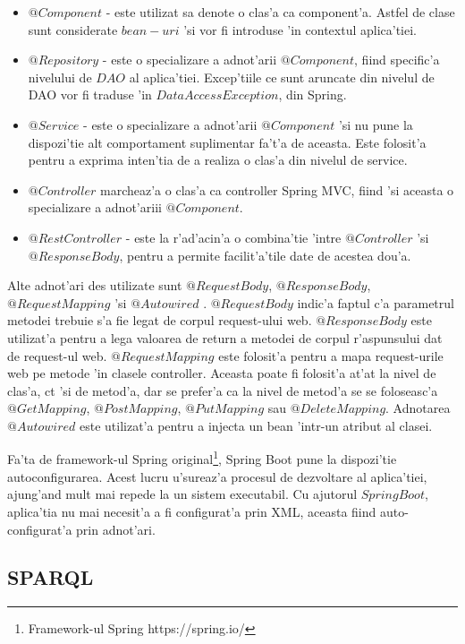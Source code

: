\documentclass[12pt,a4paper,twoside]{report}
\begin{document}
\begin{itemize}
    \item $@Component$ - este utilizat sa denote o clas'a ca component'a. Astfel de clase sunt considerate $bean-uri$ 'si vor fi introduse 'in contextul aplica'tiei.
    \item $@Repository$ - este o specializare a adnot'arii $@Component$, fiind specific'a nivelului de $DAO$ al aplica'tiei. Excep'tiile ce sunt aruncate din nivelul de DAO vor fi traduse 'in $DataAccessException$, din Spring.
    \item $@Service$ - este o specializare a adnot'arii $@Component$ 'si nu pune la dispozi'tie alt comportament suplimentar fa't'a de aceasta. Este folosit'a pentru a exprima inten'tia de a realiza o clas'a din nivelul de service.
    \item $@Controller$ marcheaz'a o clas'a ca controller Spring MVC, fiind 'si aceasta o specializare a adnot'ariii $@Component$.
    \item $@RestController$ - este la r'ad'acin'a o combina'tie 'intre $@Controller$ 'si $@ResponseBody$,  pentru a permite facilit'a'tile date de acestea dou'a.
\end{itemize}

Alte adnot'ari des utilizate sunt $@RequestBody$, $@ResponseBody$, $@RequestMapping$ 'si $@Autowired$ . $@RequestBody$ indic'a faptul c'a parametrul metodei trebuie s'a fie legat de corpul request-ului web. $@ResponseBody$ este utilizat'a pentru a lega valoarea de return a metodei de corpul r'aspunsului dat de request-ul web. $@RequestMapping$ este folosit'a pentru a mapa request-urile web pe metode 'in clasele controller. Aceasta poate fi folosit'a at'at la nivel de clas'a, c\ia t 'si de metod'a, dar se prefer'a ca la nivel de metod'a se se foloseasc'a $@GetMapping$, $@PostMapping$, $@PutMapping$ sau $@DeleteMapping$. Adnotarea $@Autowired$ este utilizat'a pentru a injecta un bean 'intr-un atribut al clasei.

Fa'ta de framework-ul Spring original\footnote{Framework-ul Spring https://spring.io/}, Spring Boot pune la dispozi'tie autoconfigurarea. Acest lucru u'sureaz'a procesul de dezvoltare al aplica'tiei, ajung'and mult mai repede la un sistem executabil. Cu ajutorul $SpringBoot$, aplica'tia nu mai necesit'a a fi configurat'a prin XML, aceasta fiind auto-configurat'a prin adnot'ari.

\subsection{SPARQL}
\end{document}
